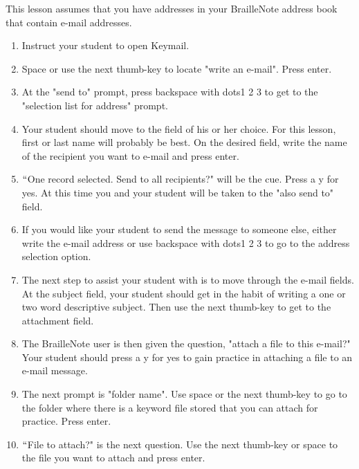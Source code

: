 \documentclass[10pt,letterpaper,twoside]{report}
\begin{document}
{{{{This lesson assumes that you have addresses in your BrailleNote address book that contain e-mail addresses.



\begin{enumerate}
	\item Instruct your student to open Keymail.
	      
	\item Space or use the next thumb-key to locate "write an e-mail".  Press enter.
	      
	\item At the "send to" prompt, press backspace with dots1 2 3 to get to the "selection list for address" prompt.
	      
	\item Your student should move to the field of his or her choice.  For this lesson, first or last name will probably be best.  On the desired field, write the name of the recipient you want to e-mail and press enter.
	      
	\item $``$One record selected. Send to all recipients?" will be the cue.  Press a y for yes.  At this time you and your student will be taken to the "also send to" field.
	      
	\item If you would like your student to send the message to someone else, either write the e-mail address or use backspace with dots1 2 3 to go to the address selection option.
	      
	\item The next step to assist your student with is to move through the e-mail fields.  At the subject field, your student should get in the habit of writing a one or two word descriptive subject.  Then use the next thumb-key to get to the attachment field.
	      
	\item The BrailleNote user is then given the question, "attach a file to this e-mail?" Your student should press a y for yes to gain practice in attaching a file to an e-mail message.
	      
	\item The next prompt is "folder name".  Use space or the next thumb-key to go to the folder where there is a keyword file stored that you can attach for practice. Press enter.
	      
	\item $``$File to attach?" is the next question.  Use the next thumb-key or space to the file you want to attach and press enter.
	      

\end{enumerate}}}}}
\end{document}
